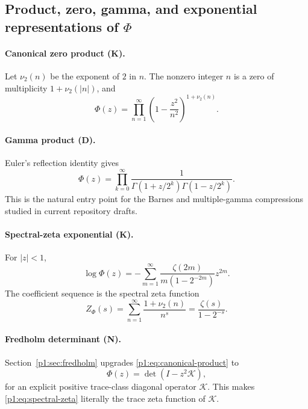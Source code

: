 \documentclass[11pt]{article}
\theoremstyle{definition}
\theoremstyle{remark}
\newcommand{\cK}{\mathcal K}
\newcommand{\statusknown}{\textsf{K}}
\newcommand{\statusderived}{\textsf{D}}
\newcommand{\statusnew}{\textsf{N}}
\begin{document}
\subsection{Product, zero, gamma, and exponential representations of \(\Phi\)}

\paragraph{Canonical zero product (\statusknown).}
Let \(\nu_2(n)\) be the exponent of \(2\) in \(n\).  The nonzero integer \(n\) is a zero of
multiplicity \(1+\nu_2(|n|)\), and
\begin{equation}
 \Phi(z)=\prod_{n=1}^{\infty}
 \left(1-\frac{z^2}{n^2}\right)^{1+\nu_2(n)}.                \label{p1:eq:canonical-product}
\end{equation}

\paragraph{Gamma product (\statusderived).}
Euler's reflection identity gives
\begin{equation}
 \Phi(z)=\prod_{k=0}^{\infty}
 \frac{1}{\Gamma(1+z/2^k)\Gamma(1-z/2^k)}.                  \label{p1:eq:gamma-product}
\end{equation}
This is the natural entry point for the Barnes and multiple-gamma compressions studied in
current repository drafts.

\paragraph{Spectral-zeta exponential (\statusknown).}
For \(|z|<1\),
\begin{equation}
 \log\Phi(z)
 =-\sum_{m=1}^{\infty}
 \frac{\zeta(2m)}{m(1-2^{-2m})}z^{2m}.                       \label{p1:eq:logPhi-zeta}
\end{equation}
The coefficient sequence is the spectral zeta function
\begin{equation}
 Z_{\Phi}(s)=\sum_{n=1}^{\infty}\frac{1+\nu_2(n)}{n^s}
 =\frac{\zeta(s)}{1-2^{-s}}.                                \label{p1:eq:spectral-zeta}
\end{equation}

\paragraph{Fredholm determinant (\statusnew).}
Section~\ref{p1:sec:fredholm} upgrades \eqref{p1:eq:canonical-product} to
\begin{equation}
 \Phi(z)=\det(I-z^2\cK),                                    \label{p1:eq:fredholm-preview}
\end{equation}
for an explicit positive trace-class diagonal operator \(\cK\).  This makes
\eqref{p1:eq:spectral-zeta} literally the trace zeta function of \(\cK\).
\end{document}
